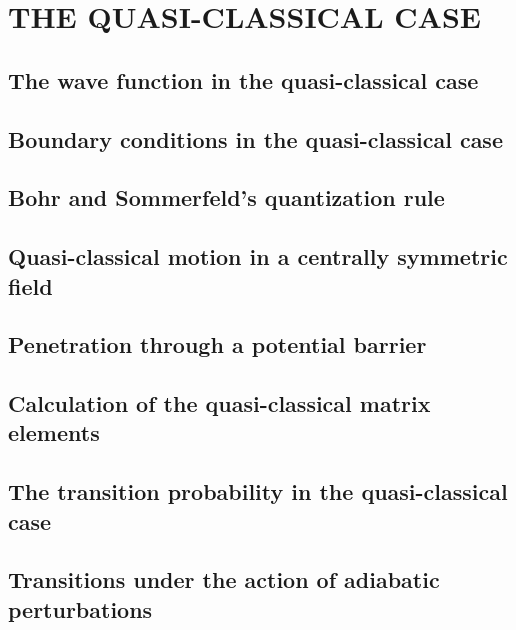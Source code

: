 \chapter{THE QUASI-CLASSICAL CASE}\label{THE QUASI-CLASSICAL CASE}
\section{The wave function in the quasi-classical case}\label{The wave function in the quasi-classical case}
\section{Boundary conditions in the quasi-classical case}\label{Boundary conditions in the quasi-classical case}
\section{Bohr and Sommerfeld’s quantization rule}\label{Bohr and Sommerfeld’s quantization rule}
\section{Quasi-classical motion in a centrally symmetric field}\label{Quasi-classical motion in a centrally symmetric field}
\section{Penetration through a potential barrier}\label{Penetration through a potential barrier}
\section{Calculation of the quasi-classical matrix elements}\label{Calculation of the quasi-classical matrix elements}
\section{The transition probability in the quasi-classical case}\label{The transition probability in the quasi-classical case}
\section{Transitions under the action of adiabatic perturbations}\label{Transitions under the action of adiabatic perturbations}
